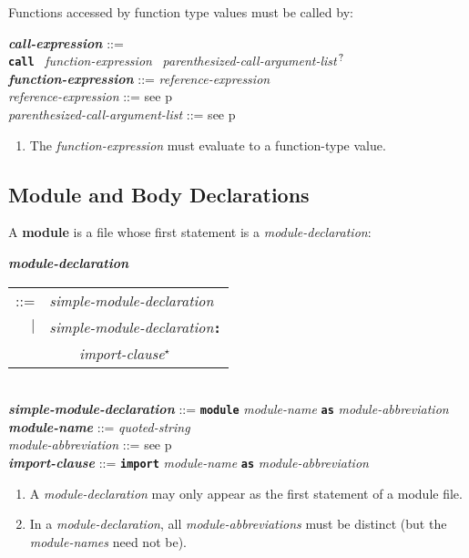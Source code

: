 \documentclass[12pt]{article}
\newcommand{\TT}[1]{{\tt \bfseries #1}}
\newcommand{\STAR}{{\Large $^\star$}}
\newcommand{\QMARK}{{$^{\,\mbox{\footnotesize ?}}$}}
\newcommand{\key}[1]{{\rm \bfseries #1}}
\newcommand{\ttkey}[1]{{\tt \bfseries #1}}
\newcommand{\emkey}[1]{{\em \bfseries #1}}
\newcommand{\pagref}[1]{p\pageref{#1}}
\newenvironment{indpar}[1][0.3in]%
	{\begin{list}{}%
		     {\setlength{\itemsep}{0in}%
		      \setlength{\topsep}{0in}%
		      \setlength{\parsep}{1ex}%
		      \setlength{\labelwidth}{#1}%
		      \setlength{\leftmargin}{#1}%
		      \addtolength{\leftmargin}{\labelsep}}%
	 \item}%
	{\end{list}}
\begin{document}
Functions accessed by function type values must be called by:
\begin{indpar}
\emkey{call-expression}\label{CALL-EXPRESSION} ::= \\
\hspace*{0.25in}
	\ttkey{call}~ {\em function-expression}~
	     {\em parenthesized-call-argument-list}\QMARK{}
\\[0.5ex]
\emkey{function-expression} ::= {\em reference-expression}
\\[0.5ex]
{\em reference-expression} ::= see \pagref{REFERENCE-EXPRESSION}
\\[0.5ex]
{\em parenthesized-call-argument-list} ::=
    see \pagref{PARENTHESIZED-CALL-ARGUMENT-LIST}
\begin{enumerate}
\item
The {\em function-expression} must evaluate to
a function-type value.
\end{enumerate}
\end{indpar}



\subsection{Module and Body Declarations}
\label{MODULE-AND-BODY-DECLARATIONS}

A \key{module} is a file whose first statement is a {\em module-declaration}:

\begin{indpar}
\emkey{module-declaration}\label{MODULE-DECLARATION}
    \begin{tabular}[t]{rl}
    ::= & {\em simple-module-declaration} \\
    $|$ & {\em simple-module-declaration}\TT{:} \\
	& \TT{~~~~}{\em import-clause}\STAR{} \\
    \end{tabular} \\
\emkey{simple-module-declaration} ::= \TT{module} {\em module-name}
        \TT{as} {\em module-abbreviation} \\
\emkey{module-name}\label{MODULE-NAME} ::= {\em quoted-string} \\
{\em module-abbreviation} ::= see \pagref{MODULE-ABBREVIATION} \\
\emkey{import-clause}\label{IMPORT-CLAUSE}
    ::= \ttkey{import} {\em module-name} \TT{as} {\em module-abbreviation}

\begin{enumerate}

\item
A {\em module-declaration} may only appear as the first statement
of a module file.

\item
In a {\em module-declaration}, all {\em module-abbreviations} must be
distinct (but the {\em module-names} need not be).
\end{enumerate}
\end{indpar}
\end{document}
